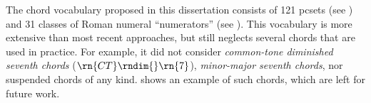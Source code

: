 
The chord vocabulary proposed in this dissertation consists
of 121 \gls{pcset}s (see
) and 31 classes of
Roman numeral ``numerators'' (see
). This
vocabulary is more extensive than most recent approaches,
but still neglects several chords that are used in practice.
For example, it did not consider
\emph{common-tone diminished seventh chords}
($\rn{CT}\rndim{}\rn{7}$), \emph{minor-major seventh
chords}, nor suspended chords of any kind.
 shows an example of such
chords, which are left for future work.

